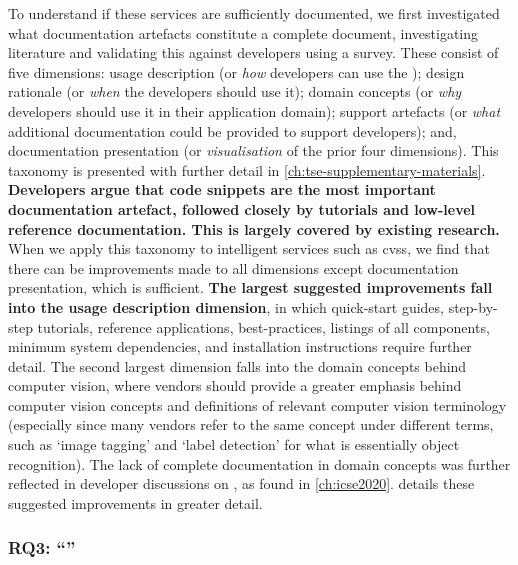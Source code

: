 To understand if these services are sufficiently documented, we first investigated what documentation artefacts constitute a complete  document, investigating literature and  validating this against developers using a survey. These consist of five dimensions: usage description (or \textit{how} developers can use the ); design rationale (or \textit{when} the developers should use it); domain concepts (or \textit{why} developers should use it in their application domain); support artefacts (or \textit{what} additional documentation could be provided to support developers); and, documentation presentation (or \textit{visualisation} of the prior four dimensions). This taxonomy is presented with further detail in \cref{ch:tse-supplementary-materials}. \textbf{Developers argue that code snippets are the most important documentation artefact, followed closely by tutorials and low-level reference documentation. This is largely covered by existing research.}
When we apply this taxonomy to intelligent services such as \glspl{cvs}, we find that there can be improvements made to all dimensions except documentation presentation, which is sufficient. \textbf{The largest suggested improvements fall into the usage description dimension}, in which quick-start guides, step-by-step tutorials, reference applications, best-practices, listings of all  components, minimum system dependencies, and installation instructions require further detail. The second largest dimension falls into the domain concepts behind computer vision, where vendors should provide a greater emphasis behind computer vision concepts and definitions of relevant computer vision terminology (especially since many vendors refer to the same concept under different terms, such as `image tagging' and `label detection' for what is essentially object recognition). The lack of complete documentation in domain concepts was further reflected in developer discussions on , as found in \cref{ch:icse2020}.  details these suggested improvements in greater detail.

\subsubsection[Answering RQ3]{RQ3: ``\RQThreeTextDevMiscomprehension{}''}


